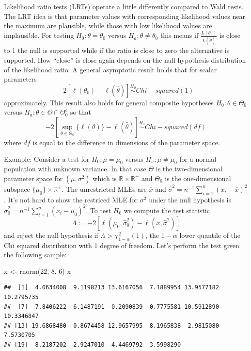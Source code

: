 \documentclass[
]{book}
\newenvironment{Shaded}{\begin{snugshade}}{\end{snugshade}}
\newcommand{\DecValTok}[1]{\textcolor[rgb]{0.00,0.00,0.81}{#1}}
\newcommand{\FunctionTok}[1]{\textcolor[rgb]{0.00,0.00,0.00}{#1}}
\newcommand{\NormalTok}[1]{#1}
\newcommand{\OtherTok}[1]{\textcolor[rgb]{0.56,0.35,0.01}{#1}}
\begin{document}
Likelihood ratio tests (LRTs) operate a little differently compared to Wald tests. The LRT idea is that parameter values with corresponding likelihood values near the maximum are plausible, while those with low likelihood values are implausible. For testing \(H_0:\theta = \theta_0\) versus \(H_a:\theta\ne \theta_0\) this means if \(\frac{L(\theta_0)}{L(\hat\theta)}\) is close to 1 the null is supported while if the ratio is close to zero the alternative is supported. How ``close'' is close again depends on the null-hypothesis distribution of the likelihood ratio. A general asymptotic result holds that for scalar parameters
\[-2[\ell(\theta_0) - \ell(\hat\theta)] \stackrel{H_0}{\sim} Chi-squared(1)\]
approximately. This result also holds for general composite hypotheses \(H_0:\theta\in \Theta_0\) versus \(H_a: \theta\in \Theta \cap \Theta_0^c\) so that
\[-2[\sup_{\theta\in \Theta_0}\{\ell(\theta)\} - \ell(\hat\theta)]\stackrel{H_0}{\sim} Chi-squared(df)\]
where \(df\) is equal to the difference in dimensions of the parameter space.

Example: Consider a test for \(H_0:\mu = \mu_0\) versus \(H_a:\mu \ne \mu_0\) for a normal population with unknown variance. In that case \(\Theta\) is the two-dimensional parameter space for \((\mu, \sigma^2)\) which is \(\mathbb{R}\times \mathbb{R}^+\) and \(\Theta_0\) is the one-dimensional subspace \(\{\mu_0\}\times \mathbb{R}^+\). The unrestricted MLEs are \(\overline x\) and \(\hat\sigma^2 = n^{-1}\sum_{i=1}^n(x_i - \overline x)^2\). It's not hard to show the restriced MLE for \(\sigma^2\) under the null hypothesis is \(\hat\sigma_0^2 = n^{-1}\sum_{i=1}^n (x_i - \mu_0)^2\). To test \(H_0\) we compute the test statistic
\[\Lambda := -2[\ell(\mu_0, \hat\sigma_0^2) - \ell(\overline x, \hat\sigma^2)]\]
and reject the null hypothesis if \(\Lambda > \chi^2_{1-\alpha}(1)\), the \(1-\alpha\) lower quantile of the Chi squared distribution with 1 degree of freedom. Let's perform the test given the following sample:

\begin{Shaded}
\begin{Highlighting}[]
\NormalTok{x }\OtherTok{\textless{}{-}} \FunctionTok{rnorm}\NormalTok{(}\DecValTok{22}\NormalTok{, }\DecValTok{8}\NormalTok{, }\DecValTok{6}\NormalTok{)}
\NormalTok{x}
\end{Highlighting}
\end{Shaded}

\begin{verbatim}
##  [1]  4.0634008  9.1198213 13.6167056  7.1889954 13.9577182 10.2795735
##  [7]  7.8406222  6.1487191  0.2090839  0.7775581 10.5912890 10.3346847
## [13] 19.6868480  0.8674458 12.9657995  8.1965838  2.9815080  7.5730705
## [19]  8.2187202  2.9247010  4.4469792  3.5998290
\end{verbatim}
\end{document}
